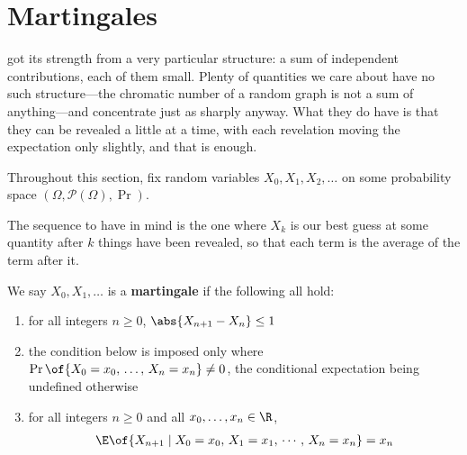 \section{Martingales} \label{Ch3:Sec:Martingales}

 got its strength from a very particular structure: a sum of independent contributions, each of them small. Plenty of quantities we care about have no such structure---the chromatic number of a random graph is not a sum of anything---and concentrate just as sharply anyway. What they do have is that they can be revealed a little at a time, with each revelation moving the expectation only slightly, and that is enough.

Throughout this section, fix random variables $X_0, X_1, X_2, \ldots$ on some probability space $(\Omega, \mathcal{P}(\Omega), \Pr)$.

The sequence to have in mind is the one where $X_k$ is our best guess at some quantity after $k$ things have been revealed, so that each term is the average of the term after it.

\begin{boxdefinition}[Martingale]
    We say $X_0, X_1, \ldots$ is a \textbf{martingale} if the following all hold:
    \begin{enumerate}
        \item for all integers $n \geq 0$, $\abs{X_{n+1} - X_n} \leq 1$
        \item the condition below is imposed only where $\Pr\of{X_0 = x_0, \, \ldots, \, X_n = x_n} \neq 0$, the conditional expectation being undefined otherwise
        \item for all integers $n \geq 0$ and all $x_0, \ldots, x_n \in \R$,
        \begin{align*}
            \E\of{X_{n + 1} \mid X_0 = x_0, \, X_1 = x_1, \, \cdots, \, X_n = x_n} = x_n
        \end{align*}
    \end{enumerate}
\end{boxdefinition}

